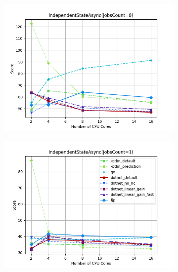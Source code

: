 \documentclass{article}
\begin{document}
\begin{figure}[H]
    \begin{subfigure}[b]{0.48\textwidth}
        \includegraphics[width=\linewidth]{plots/independentStateAsync(jobsCount=8).png}
    \end{subfigure}
    \begin{subfigure}[b]{0.48\textwidth}
        \includegraphics[width=\linewidth]{plots/independentStateAsync(jobsCount=1)_with_legend.png}
    \end{subfigure}

    \vspace{1em}


\end{figure}
\end{document}
